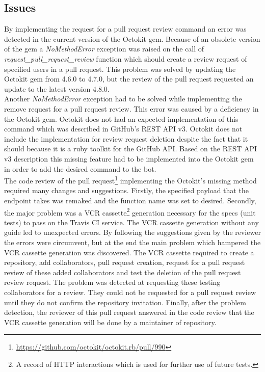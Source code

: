 \subsection{Issues}

By implementing the request for a pull request review command an error was detected in the current version of the Octokit gem. Because of an obsolete version of the gem a \textit{NoMethodError} exception was raised on the call of \textit{request\_pull\_request\_review} function which should create a review request of specified users in a pull request. This problem was solved by updating the Octokit gem from 4.6.0 to 4.7.0, but the review of the pull request requested an update to the latest version 4.8.0.\\

Another \textit{NoMethodError} exception had to be solved while implementing the remove request for a pull request review. This error was caused by a deficiency in the Octokit gem. Octokit does not had an expected implementation of this command which was described in GitHub’s REST API v3. Octokit does not include the implementation for review request deletion despite the fact that it should because it is a ruby toolkit for the GitHub API. Based on the REST API v3 description this missing feature had to be implemented into the Octokit gem in order to add the desired command to the bot.\\

The code review of the pull request\footnote{\url{https://github.com/octokit/octokit.rb/pull/990}} implementing the Octokit's missing method required many changes and suggestions. Firstly, the specified payload that the endpoint takes was remaked and the function name was set to desired. Secondly, the major problem was a VCR cassette\footnote{A record of HTTP interactions which is used for further use of future tests.} generation necessary for the specs (unit tests) to pass on the Travis CI service. The VCR cassette generation without any guide led to unexpected errors. By following the suggestions given by the reviewer the errors were circumvent, but at the end the main problem which hampered the VCR cassette generation was discovered. The VCR cassette required to create a repository, add collaborators, pull request creation, request for a pull request review of these added collaborators and test the deletion of the pull request review request. The problem was detected at requesting these testing collaborators for a review. They could not be requested for a pull request review until they do not confirm the repository invitation. Finally, after the problem detection, the reviewer of this pull request answered in the code review that the VCR cassette generation will be done by a maintainer of repository.\\

